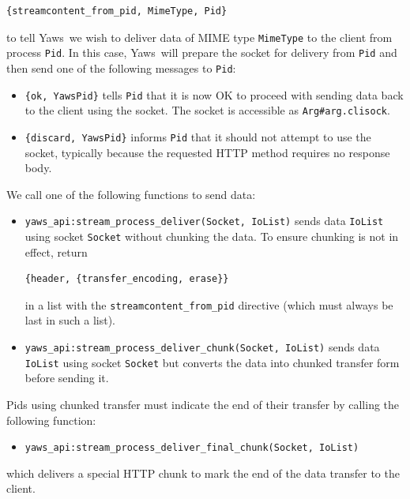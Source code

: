 \documentclass[11pt,oneside,english]{book}
\newcommand{\Yaws}            %
        {{\sc Yaws}}
\begin{document}
\begin{verbatim}
{streamcontent_from_pid, MimeType, Pid}
\end{verbatim}

\noindent to tell \Yaws\ we wish to deliver data of MIME type
\verb+MimeType+ to the client from process \verb+Pid+. In this case,
\Yaws\ will prepare the socket for delivery from \verb+Pid+ and then
send one of the following messages to \verb+Pid+:
\begin{itemize}
\item \verb+{ok, YawsPid}+ tells \verb+Pid+ that it is now OK to
  proceed with sending data back to the client using the socket. The
  socket is accessible as \verb+Arg#arg.clisock+.

\item \verb+{discard, YawsPid}+ informs \verb+Pid+ that it should not
  attempt to use the socket, typically because the requested HTTP
  method requires no response body.
\end{itemize}

We call one of the following functions to send data:
\begin{itemize}
\item \verb+yaws_api:stream_process_deliver(Socket, IoList)+ sends data
  \verb+IoList+ using socket \verb+Socket+ without chunking the data. To
  ensure chunking is not in effect, return

\begin{verbatim}
{header, {transfer_encoding, erase}}
\end{verbatim}

  in a list with the \verb+streamcontent_from_pid+ directive (which must
  always be last in such a list).

\item \verb+yaws_api:stream_process_deliver_chunk(Socket, IoList)+
  sends data \verb+IoList+ using socket \verb+Socket+ but converts
  the data into chunked transfer form before sending it.
\end{itemize}

Pids using chunked transfer must indicate the end of their transfer by
calling the following function:
\begin{itemize}
\item \verb+yaws_api:stream_process_deliver_final_chunk(Socket, IoList)+
\end{itemize}

which delivers a special HTTP chunk to mark the end of the data
transfer to the client.
\end{document}
